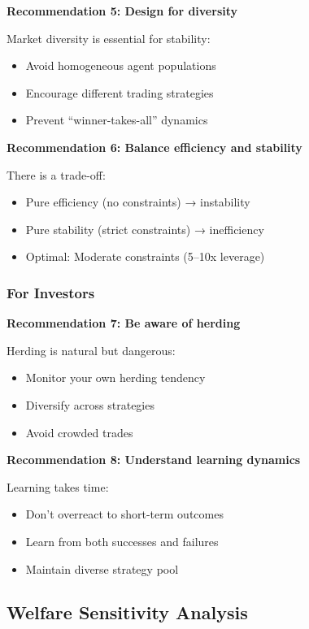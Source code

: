 \textbf{Recommendation 5: Design for diversity}

Market diversity is essential for stability:
\begin{itemize}
    \item Avoid homogeneous agent populations
    \item Encourage different trading strategies
    \item Prevent ``winner-takes-all'' dynamics
\end{itemize}

\textbf{Recommendation 6: Balance efficiency and stability}

There is a trade-off:
\begin{itemize}
    \item Pure efficiency (no constraints) → instability
    \item Pure stability (strict constraints) → inefficiency
    \item Optimal: Moderate constraints (5--10x leverage)
\end{itemize}

\subsubsection{For Investors}

\textbf{Recommendation 7: Be aware of herding}

Herding is natural but dangerous:
\begin{itemize}
    \item Monitor your own herding tendency
    \item Diversify across strategies
    \item Avoid crowded trades
\end{itemize}

\textbf{Recommendation 8: Understand learning dynamics}

Learning takes time:
\begin{itemize}
    \item Don't overreact to short-term outcomes
    \item Learn from both successes and failures
    \item Maintain diverse strategy pool
\end{itemize}

\subsection{Welfare Sensitivity Analysis}

